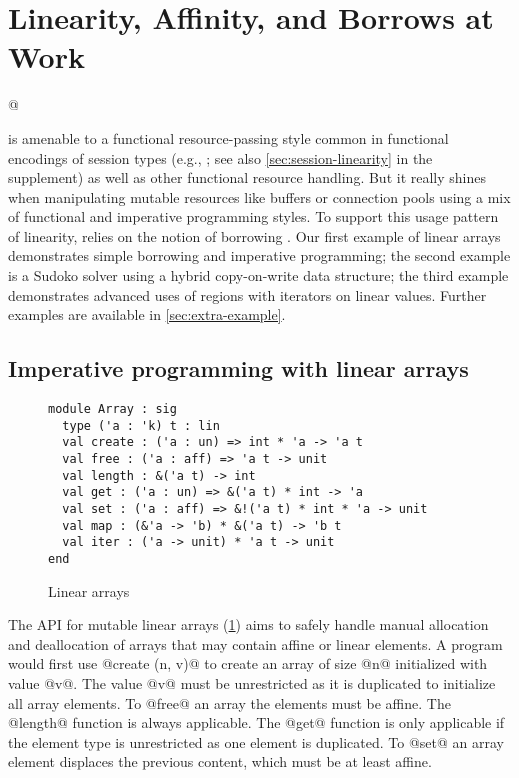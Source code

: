 \section{Linearity, Affinity, and Borrows at Work}
\label{motivation}

\lstMakeShortInline[keepspaces,basicstyle=\small\ttfamily]@

\lang{} is amenable to a functional resource-passing style
common in functional encodings of session types (e.g.,
\cite{DBLP:journals/jfp/Padovani17}; see also
\cref{sec:session-linearity} in the supplement) as well as other
functional resource handling. But it really shines
when manipulating mutable resources like buffers or connection pools
using a mix of functional and imperative programming styles.
%
To support this usage pattern of linearity, \lang{} relies on
the notion of borrowing \cite{DBLP:conf/popl/BoylandR05}. Our first
example of linear arrays demonstrates simple borrowing and
imperative programming; the second example is a Sudoko solver using a
hybrid copy-on-write data structure; the third example demonstrates advanced uses
of regions with iterators on linear values.
Further examples are available in \cref{sec:extra-example}.

\subsection{Imperative programming with linear arrays}
\label{sec:imper-progr}

\begin{figure}[tp]
  \centering
\begin{lstlisting}[numbers=none]
module Array : sig
  type ('a : 'k) t : lin
  val create : ('a : un) => int * 'a -> 'a t
  val free : ('a : aff) => 'a t -> unit
  val length : &('a t) -> int
  val get : ('a : un) => &('a t) * int -> 'a
  val set : ('a : aff) => &!('a t) * int * 'a -> unit
  val map : (&'a -> 'b) * &('a t) -> 'b t
  val iter : ('a -> unit) * 'a t -> unit
end
\end{lstlisting}
  \vspace{-15pt}
  \caption{Linear arrays}
  \label{ex:array}
  \label{sig:array}
  \vspace{-10pt}
\end{figure}

The API for mutable linear arrays (\cref{sig:array})
aims to safely handle manual allocation and
deallocation of arrays that may contain affine or linear elements.
A program would first use @create (n, v)@ to create
an array of size @n@ initialized with value
@v@. The value @v@ must be unrestricted as it is duplicated to
initialize all array elements.
To @free@ an array the elements must be affine. 
The @length@ function is always applicable.
The @get@ function is only applicable
if the element type is unrestricted as one element is duplicated.
To @set@ an array element displaces the previous content, which must
be at least affine.

